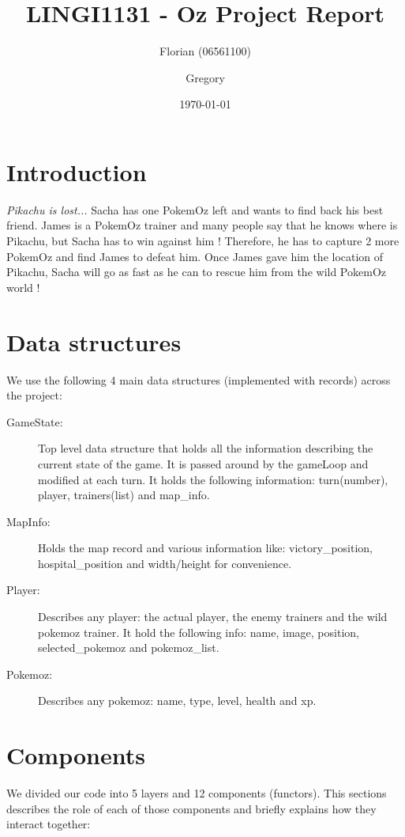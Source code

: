 \documentclass[10pt, a4paper]{article}
\author{Florian \bsc{Thuin} (06561100) \and Gregory \bsc{Vander Schueren}}
\title{LINGI1131 - Oz Project Report}
\date{\today}
\begin{document}
\maketitle

\section*{Introduction}

\textit{Pikachu is lost...} Sacha has one PokemOz left and wants to find back his best friend. James is a PokemOz trainer and many people say that he knows where is Pikachu, but Sacha has to win against him ! Therefore, he has to capture 2 more PokemOz and find James to defeat him. Once James gave him the location of Pikachu, Sacha will go as fast as he can to rescue him from the wild PokemOz world ! 

\section{Data structures}

We use the following 4 main data structures (implemented with records) across the project:

\begin{description}
  \item [GameState:] Top level data structure that holds all the information describing the current state of the game. It is passed around by the gameLoop and modified at each turn. It holds the following information: turn(number), player, trainers(list) and map\_info.
  \item [MapInfo:] Holds the map record and various information like: victory\_position, hospital\_position and width/height for convenience.
  \item [Player:] Describes any player: the actual player, the enemy trainers and the \og{}wild pokemoz\fg{} trainer. It hold the following info: name, image, position, selected\_pokemoz and pokemoz\_list.
  \item [Pokemoz:] Describes any pokemoz: name, type, level, health and xp.

\end{description}

\section{Components}

We divided our code into 5 layers and 12 \og{}components\fg{} (functors). This sections describes the role of each of those components and briefly explains how they interact together:
\end{document}
